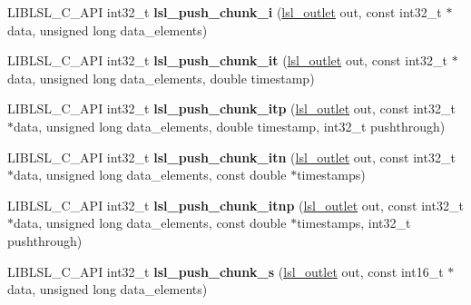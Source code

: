 \begin{DoxyCompactItemize}
\mbox{\label{namespacelsl_a096b23637c04d20bcaea1a92bc438845}} 
L\+I\+B\+L\+S\+L\+\_\+\+C\+\_\+\+A\+PI int32\+\_\+t {\bfseries lsl\+\_\+push\+\_\+chunk\+\_\+i} (\hyperlink{namespacelsl_abcf512b0f66dacf86c10b165995fd50b}{lsl\+\_\+outlet} out, const int32\+\_\+t $\ast$data, unsigned long data\+\_\+elements)
\item 
\mbox{\label{namespacelsl_aede257c8d3911fbc26329bd4af8bcc9a}} 
L\+I\+B\+L\+S\+L\+\_\+\+C\+\_\+\+A\+PI int32\+\_\+t {\bfseries lsl\+\_\+push\+\_\+chunk\+\_\+it} (\hyperlink{namespacelsl_abcf512b0f66dacf86c10b165995fd50b}{lsl\+\_\+outlet} out, const int32\+\_\+t $\ast$data, unsigned long data\+\_\+elements, double timestamp)
\item 
\mbox{\label{namespacelsl_a38439e357a8d6c984ffcfd9e22596ec1}} 
L\+I\+B\+L\+S\+L\+\_\+\+C\+\_\+\+A\+PI int32\+\_\+t {\bfseries lsl\+\_\+push\+\_\+chunk\+\_\+itp} (\hyperlink{namespacelsl_abcf512b0f66dacf86c10b165995fd50b}{lsl\+\_\+outlet} out, const int32\+\_\+t $\ast$data, unsigned long data\+\_\+elements, double timestamp, int32\+\_\+t pushthrough)
\item 
\mbox{\label{namespacelsl_a0ea52f33684ceab15ad7244636291ddd}} 
L\+I\+B\+L\+S\+L\+\_\+\+C\+\_\+\+A\+PI int32\+\_\+t {\bfseries lsl\+\_\+push\+\_\+chunk\+\_\+itn} (\hyperlink{namespacelsl_abcf512b0f66dacf86c10b165995fd50b}{lsl\+\_\+outlet} out, const int32\+\_\+t $\ast$data, unsigned long data\+\_\+elements, const double $\ast$timestamps)
\item 
\mbox{\label{namespacelsl_a9102a7929e172f9a42e51211139d691f}} 
L\+I\+B\+L\+S\+L\+\_\+\+C\+\_\+\+A\+PI int32\+\_\+t {\bfseries lsl\+\_\+push\+\_\+chunk\+\_\+itnp} (\hyperlink{namespacelsl_abcf512b0f66dacf86c10b165995fd50b}{lsl\+\_\+outlet} out, const int32\+\_\+t $\ast$data, unsigned long data\+\_\+elements, const double $\ast$timestamps, int32\+\_\+t pushthrough)
\item 
\mbox{\label{namespacelsl_ac2e4e87bd196fe5469934eaf87ecdaa2}} 
L\+I\+B\+L\+S\+L\+\_\+\+C\+\_\+\+A\+PI int32\+\_\+t {\bfseries lsl\+\_\+push\+\_\+chunk\+\_\+s} (\hyperlink{namespacelsl_abcf512b0f66dacf86c10b165995fd50b}{lsl\+\_\+outlet} out, const int16\+\_\+t $\ast$data, unsigned long data\+\_\+elements)
\item 

\end{DoxyCompactItemize}
